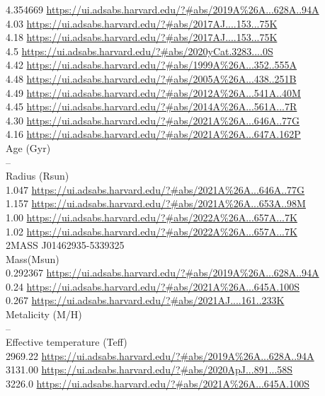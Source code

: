 4.354669 \url{https://ui.adsabs.harvard.edu/?#abs/2019A%26A...628A..94A}\\
4.03 \url{https://ui.adsabs.harvard.edu/?#abs/2017AJ....153...75K}\\
4.18 \url{https://ui.adsabs.harvard.edu/?#abs/2017AJ....153...75K}\\
4.5	\url{https://ui.adsabs.harvard.edu/?#abs/2020yCat.3283....0S}\\
4.42 \url{https://ui.adsabs.harvard.edu/?#abs/1999A%26A...352..555A}\\
4.48 \url{https://ui.adsabs.harvard.edu/?#abs/2005A%26A...438..251B}\\
4.49 \url{https://ui.adsabs.harvard.edu/?#abs/2012A%26A...541A..40M}\\
4.45 \url{https://ui.adsabs.harvard.edu/?#abs/2014A%26A...561A...7R}\\
4.30 \url{https://ui.adsabs.harvard.edu/?#abs/2021A%26A...646A..77G}\\
4.16 \url{https://ui.adsabs.harvard.edu/?#abs/2021A%26A...647A.162P}\\
Age (Gyr)\\
--\\
Radius (Rsun)\\
1.047 \url{https://ui.adsabs.harvard.edu/?#abs/2021A%26A...646A..77G}\\
1.157 \url{https://ui.adsabs.harvard.edu/?#abs/2021A%26A...653A..98M}\\
1.00 \url{https://ui.adsabs.harvard.edu/?#abs/2022A%26A...657A...7K}\\
1.02 \url{https://ui.adsabs.harvard.edu/?#abs/2022A%26A...657A...7K}\\
2MASS J01462935-5339325\\
Mass(Msun)\\
0.292367 \url{https://ui.adsabs.harvard.edu/?#abs/2019A%26A...628A..94A}\\
0.24 \url{https://ui.adsabs.harvard.edu/?#abs/2021A%26A...645A.100S}\\
0.267 \url{https://ui.adsabs.harvard.edu/?#abs/2021AJ....161..233K}\\
Metalicity (M/H)\\
--\\
Effective temperature (Teff) \\
2969.22 \url{https://ui.adsabs.harvard.edu/?#abs/2019A%26A...628A..94A}\\
3131.00 \url{https://ui.adsabs.harvard.edu/?#abs/2020ApJ...891...58S}\\
3226.0 \url{https://ui.adsabs.harvard.edu/?#abs/2021A%26A...645A.100S}\\
